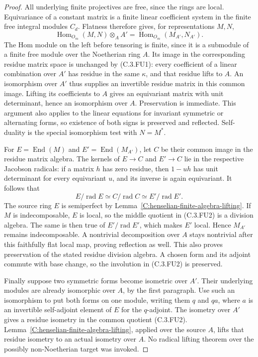 \begin{proof}
All underlying finite projectives are free, since the
rings are local.  Equivariance of a constant matrix
is a finite linear coefficient system in the finite
free integral modules $C_d$.
Flatness therefore gives, for representations $M,N$,
\[
 \operatorname{Hom}_{O_m}(M,N)\otimes_A A'
       =\operatorname{Hom}_{O_m}(M_{A'},N_{A'}).           \tag{C.3.FU1}
\]
The Hom module on the left before tensoring is finite,
since it is a submodule of a finite free module over
the Noetherian ring $A$.
Its image in the corresponding residue matrix space
is unchanged by (C.3.FU1): every coefficient of a
linear combination over $A'$ has residue in the
same $\kappa$, and that residue lifts to $A$.
An isomorphism over $A'$ thus supplies an invertible
residue matrix in this common image.  Lifting its
coefficients to $A$ gives an equivariant matrix with
unit determinant, hence an isomorphism over $A$.
Preservation is immediate.  This argument also
applies to the linear equations for invariant
symmetric or alternating forms, so existence of
both signs is preserved and reflected.
Self-duality is the special isomorphism test with
$N=M^*$.

For $E=\operatorname{End}(M)$ and
$E'=\operatorname{End}(M_{A'})$, let $C$ be their
common image in the residue matrix algebra.
The kernels of $E\to C$ and $E'\to C$ lie in the
respective Jacobson radicals: if a matrix $h$ has
zero residue, then $1-uh$ has unit determinant
for every equivariant $u$, and its inverse is
again equivariant.  It follows that
\[
 E/\operatorname{rad}E\simeq
 C/\operatorname{rad}C\simeq
 E'/\operatorname{rad}E'.                                \tag{C.3.FU2}
\]
The source ring $E$ is semiperfect by
Lemma~\ref{C:henselian-finite-algebra-lifting}.
If $M$ is indecomposable, $E$ is local, so the
middle quotient in (C.3.FU2) is a division algebra.
The same is then true of $E'/\operatorname{rad}E'$,
which makes $E'$ local.  Hence $M_{A'}$ remains
indecomposable.  A nontrivial decomposition over
$A$ stays nontrivial after this faithfully flat
local map, proving reflection as well.
This also proves preservation of the stated
residue division algebra.  A chosen form and
its adjoint commute with base change, so the
involution in (C.3.FU2) is preserved.

Finally suppose two symmetric forms become
isometric over $A'$.  Their underlying modules
are already isomorphic over $A$, by the first
paragraph.  Use such an isomorphism to put both
forms on one module, writing them $q$ and $q a$,
where $a$ is an invertible self-adjoint element
of $E$ for the $q$-adjoint.
The isometry over $A'$ gives a residue isometry
in the common quotient (C.3.FU2).
Lemma~\ref{C:henselian-finite-algebra-lifting},
applied over the source $A$, lifts that residue
isometry to an actual isometry over $A$.
No radical lifting theorem over the possibly
non-Noetherian target was invoked.
\end{proof}

